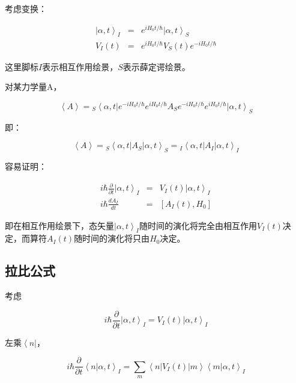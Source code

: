 考虑变换：

\begin{eqnarray}
\left| \alpha, t \right\rangle_I & = & e^{i H_0 t /\hbar}  \left| \alpha, t \right\rangle_S\\
V_I(t) & = & e^{i H_0 t /\hbar} V_S(t) e^{ - i H_0 t /\hbar}
\end{eqnarray}

这里脚标$I$表示相互作用绘景，$S$表示薛定谔绘景。

对某力学量A，

\begin{equation}
\left\langle A \right\rangle = {}_S\left\langle \alpha,t \right| e^{ - i H_0 t /\hbar} e^{i H_0 t /\hbar} A_S e^{ - i H_0 t /\hbar}   e^{i H_0 t /\hbar} \left| \alpha, t \right\rangle_S
\end{equation}

即：

\begin{equation}
\left\langle A \right\rangle = {}_S\left\langle \alpha, t \right| A_S \left| \alpha, t  \right\rangle_S = {}_I\left\langle \alpha, t \right| A_I \left| \alpha,t  \right\rangle_I
\end{equation}

容易证明：

\begin{eqnarray}
i \hbar \frac{\partial }{\partial t} \left| \alpha,t  \right\rangle_I & = & V_I(t) \left| \alpha,t  \right\rangle_I \\
i \hbar \frac{d A_I}{dt}& = & [A_I(t) , H_0 ]
\end{eqnarray}

即在相互作用绘景下，态矢量$\left| \alpha,t  \right\rangle_I$随时间的演化将完全由相互作用$V_I(t)$决定，而算符$A_I(t)$随时间的演化将只由$H_0$决定。

\subsection{拉比公式}

考虑

\begin{equation}
i \hbar \frac{\partial }{\partial t} \left| \alpha,t  \right\rangle_I = V_I(t) \left| \alpha,t  \right\rangle_I
\end{equation}

左乘$\left\langle n \right|$，

\begin{equation}
i \hbar \frac{\partial }{\partial t}  \left\langle n  | \alpha,t  \right\rangle_I = \sum\limits_m \left\langle n \right| V_I(t) \left| m \right\rangle \left\langle m | \alpha,t  \right\rangle_I
\end{equation}

